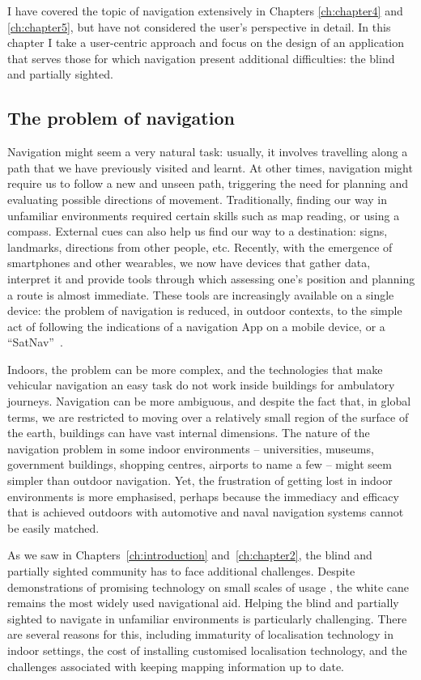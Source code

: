 I have covered the topic of navigation extensively in Chapters \ref{ch:chapter4} and \ref{ch:chapter5}, but have not considered the user's perspective in detail. In this chapter I take a user-centric approach and focus on the design of an application that serves those for which navigation present additional difficulties: the blind and partially sighted.

\subsection{The problem of navigation}

Navigation might seem a very natural task: usually, it involves travelling along a path that we have previously visited and learnt. At other times, navigation might require us to follow a new and unseen path, triggering the need for planning and evaluating possible directions of movement. Traditionally, finding our way in unfamiliar environments required certain skills such as map reading, or using a compass. External cues can also help us find our way to a destination: signs, landmarks, directions from other people, etc. Recently, with the emergence of smartphones and other wearables, we now have devices that gather data, interpret it and provide tools through which assessing one's position and planning a route is almost immediate. These tools are increasingly available on a single device: the problem of navigation is reduced, in outdoor contexts, to the simple act of following the indications of a navigation App on a mobile device, or a ``SatNav''~\citep{spirkovska2005summary}.


Indoors, the problem can be more complex, and the technologies that make vehicular navigation an easy task do not work inside buildings for ambulatory journeys. Navigation can be more ambiguous, and despite the fact that, in global terms, we are restricted to moving over a relatively small region of the surface of the earth, buildings can have vast internal dimensions.  The nature of the navigation problem in some indoor environments -- universities, museums, government buildings, shopping centres, airports to name a few -- might seem simpler than outdoor navigation. Yet, the frustration of getting lost in indoor environments is more emphasised, perhaps because the immediacy and efficacy that is achieved outdoors with automotive and naval navigation systems cannot be easily matched.
 
As we saw in Chapters~\ref{ch:introduction} and~\ref{ch:chapter2}, the blind and partially sighted community has to face additional challenges. Despite demonstrations of promising technology on small scales of usage \citep{blindSquare,maidenbaum2013increasing,liu2010video}, the white cane remains the most widely used navigational aid. Helping the blind and partially sighted to navigate in unfamiliar environments is particularly challenging. There are several reasons for this, including immaturity of localisation technology in indoor settings, the cost of installing customised localisation technology, and the challenges associated with keeping mapping information up to date. 

